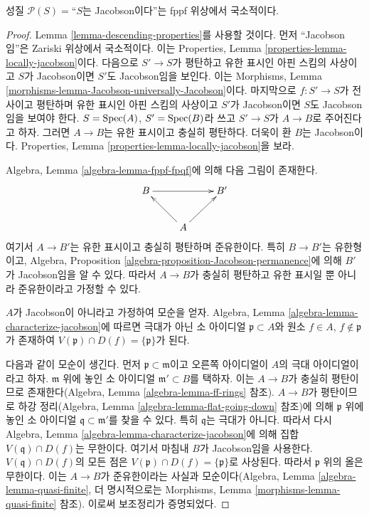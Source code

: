 \begin{lemma}
\label{lemma-Jacobson-local-fppf}
성질 $\mathcal{P}(S) =$``$S$는 Jacobson이다''는 fppf 위상에서 국소적이다.
\end{lemma}

\begin{proof}
Lemma \ref{lemma-descending-properties}를 사용할 것이다. 먼저 ``Jacobson임''은
Zariski 위상에서 국소적이다. 이는 Properties, Lemma
\ref{properties-lemma-locally-jacobson}이다. 다음으로 $S' \to S$가 평탄하고
유한 표시인 아핀 스킴의 사상이고 $S$가 Jacobson이면 $S'$도 Jacobson임을
보인다. 이는 Morphisms, Lemma
\ref{morphisms-lemma-Jacobson-universally-Jacobson}이다. 마지막으로
$f : S' \to S$가 전사이고 평탄하며 유한 표시인 아핀 스킴의 사상이고
$S'$가 Jacobson이면 $S$도 Jacobson임을 보여야 한다. $S = \mathop{\mathrm{Spec}}(A)$,
$S' = \mathop{\mathrm{Spec}}(B)$라 쓰고 $S' \to S$가 $A \to B$로 주어진다고 하자. 그러면
$A \to B$는 유한 표시이고 충실히 평탄하다. 더욱이 환 $B$는 Jacobson이다.
Properties, Lemma \ref{properties-lemma-locally-jacobson}을 보라.

\medskip\noindent
Algebra, Lemma \ref{algebra-lemma-fppf-fpqf}에 의해 다음 그림이 존재한다.
$$
\xymatrix{
B \ar[rr] & & B' \\
& A \ar[ru] \ar[lu] &
}
$$
여기서 $A \to B'$는 유한 표시이고 충실히 평탄하며 준유한이다. 특히
$B \to B'$는 유한형이고, Algebra, Proposition
\ref{algebra-proposition-Jacobson-permanence}에 의해 $B'$가 Jacobson임을
알 수 있다. 따라서 $A \to B$가 충실히 평탄하고 유한 표시일 뿐 아니라
준유한이라고 가정할 수 있다.

\medskip\noindent
$A$가 Jacobson이 아니라고 가정하여 모순을 얻자. Algebra, Lemma
\ref{algebra-lemma-characterize-jacobson}에 따르면 극대가 아닌 소 아이디얼
$\mathfrak p \subset A$와 원소 $f \in A$, $f \not \in \mathfrak p$가
존재하여 $V(\mathfrak p) \cap D(f) = \{\mathfrak p\}$가 된다.

\medskip\noindent
다음과 같이 모순이 생긴다. 먼저 $\mathfrak p \subset \mathfrak m$이고
오른쪽 아이디얼이 $A$의 극대 아이디얼이라고 하자. $\mathfrak m$ 위에 놓인
소 아이디얼 $\mathfrak m' \subset B$를 택하자. 이는 $A \to B$가 충실히
평탄이므로 존재한다(Algebra, Lemma \ref{algebra-lemma-ff-rings} 참조).
$A \to B$가 평탄이므로 하강 정리(Algebra, Lemma
\ref{algebra-lemma-flat-going-down} 참조)에 의해 $\mathfrak p$ 위에 놓인
소 아이디얼 $\mathfrak q \subset \mathfrak m'$를 찾을 수 있다. 특히
$\mathfrak q$는 극대가 아니다. 따라서 다시 Algebra, Lemma
\ref{algebra-lemma-characterize-jacobson}에 의해 집합
$V(\mathfrak q) \cap D(f)$는 무한이다. 여기서 마침내 $B$가 Jacobson임을
사용한다. $V(\mathfrak q) \cap D(f)$의 모든 점은
$V(\mathfrak p) \cap D(f) = \{\mathfrak p\}$로 사상된다. 따라서
$\mathfrak p$ 위의 올은 무한이다. 이는 $A \to B$가 준유한이라는 사실과
모순이다(Algebra, Lemma \ref{algebra-lemma-quasi-finite}, 더 명시적으로는
Morphisms, Lemma \ref{morphisms-lemma-quasi-finite} 참조). 이로써 보조정리가
증명되었다.
\end{proof}

